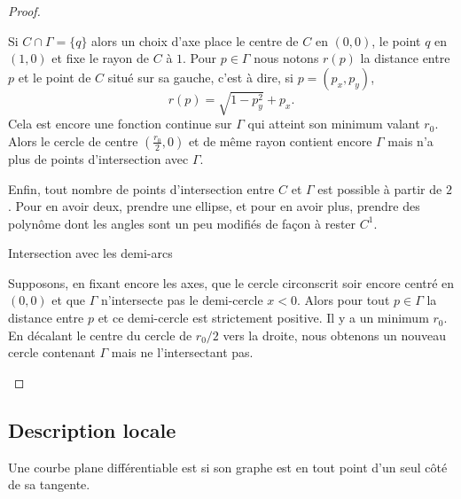 \begin{proof}
\begin{subproof}
        Si \( C\cap \Gamma=\{ q \}\) alors un choix d'axe place le centre de \( C\) en \( (0,0)\), le point \( q\) en \( (1,0)\) et fixe le rayon de \( C\) à \( 1\). Pour \( p\in \Gamma\) nous notons \( r(p)\) la distance entre \( p\) et le point de \( C\) situé sur sa gauche, c'est à dire, si \( p=(p_x,p_y)\),
        \begin{equation}
            r(p)=\sqrt{ 1-p_y^2 }+p_x.
        \end{equation}
        Cela est encore une fonction continue sur \( \Gamma\) qui atteint son minimum valant \( r_0\). Alors le cercle de centre \( (\frac{ r_0 }{2},0)\) et de même rayon contient encore \( \Gamma\) mais n'a plus de points d'intersection avec \( \Gamma\).

        Enfin, tout nombre de points d'intersection entre \( C\) et \( \Gamma\) est possible à partir de \( 2\). Pour en avoir deux, prendre une ellipse, et pour en avoir plus, prendre des polynôme dont les angles sont un peu modifiés de façon à rester \( C^1\).

    \item[Intersection avec les demi-arcs]

        Supposons, en fixant encore les axes, que le cercle circonscrit soir encore centré en \( (0,0)\) et que \( \Gamma\) n'intersecte pas le demi-cercle \( x<0\). Alors pour tout \( p\in \Gamma\) la distance entre \( p\) et ce demi-cercle est strictement positive. Il y a un minimum \( r_0\). En décalant le centre du cercle de \( r_0/2\) vers la droite, nous obtenons un nouveau cercle contenant \( \Gamma\) mais ne l'intersectant pas.
    \end{subproof}
\end{proof}

\subsection{Description locale}

\begin{definition}      \label{DEFooVQODooJSNYLw}
    Une courbe plane différentiable est  si son graphe est en tout point d'un seul côté de sa tangente.
\end{definition}


